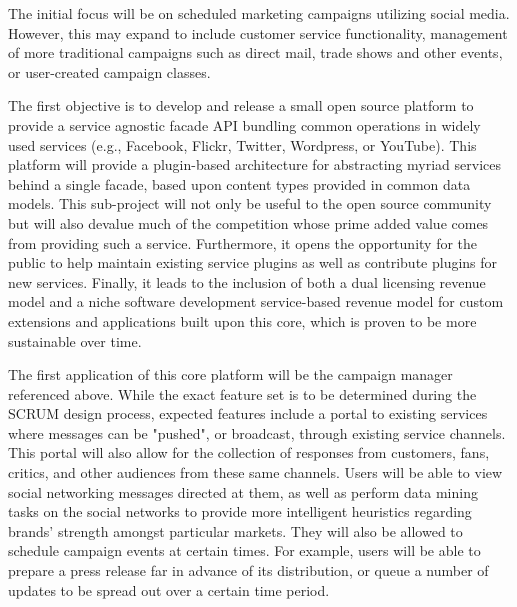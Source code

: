 \documentclass{article}
\begin{document}
The initial focus will be on scheduled marketing campaigns utilizing
social media. However, this may expand to include customer service
functionality, management of more traditional campaigns such as
direct mail, trade shows and other events, or user-created campaign
classes.
 
The first objective is to develop and release a small open source
platform to provide a service agnostic facade API bundling common
operations in widely used services (e.g., Facebook, Flickr, Twitter,
Wordpress, or YouTube). This platform will provide a plugin-based
architecture for abstracting myriad services behind a single facade,
based upon content types provided in common data models. This
sub-project will not only be useful to the open source community but
will also devalue much of the competition whose prime added value
comes from providing such a service. Furthermore, it opens the
opportunity for the public to help maintain existing service plugins
as well as contribute plugins for new services. Finally, it leads to
the inclusion of both a dual licensing revenue model and a niche
software development service-based revenue model for custom extensions
and applications built upon this core, which is proven to be more
sustainable over time.
 
The first application of this core platform will be the campaign
manager referenced above.  While the exact feature set is to be
determined during the SCRUM design process, expected features include a
portal to existing services where messages can be "pushed", or
broadcast, through existing service channels. This portal will also
allow for the collection of responses from customers, fans, critics,
and other audiences from these same channels. Users will be able to
view social networking messages directed at them, as well as perform
data mining tasks on the social networks to provide more intelligent
heuristics regarding brands' strength amongst particular markets. They
will also be allowed to schedule campaign events at certain times. For
example, users will be able to prepare a press release far in advance
of its distribution, or queue a number of updates to be spread out
over a certain time period.
\end{document}
